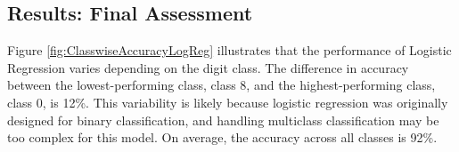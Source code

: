 \subsection{Results: Final Assessment}

Figure \ref{fig:ClasswiseAccuracyLogReg} illustrates that the performance of Logistic Regression varies depending on the digit class. The difference in accuracy between the lowest-performing class, class 8, and the highest-performing class, class 0, is 12\%. This variability is likely because logistic regression was originally designed for binary classification, and handling multiclass classification may be too complex for this model. On average, the accuracy across all classes is 92\%.

